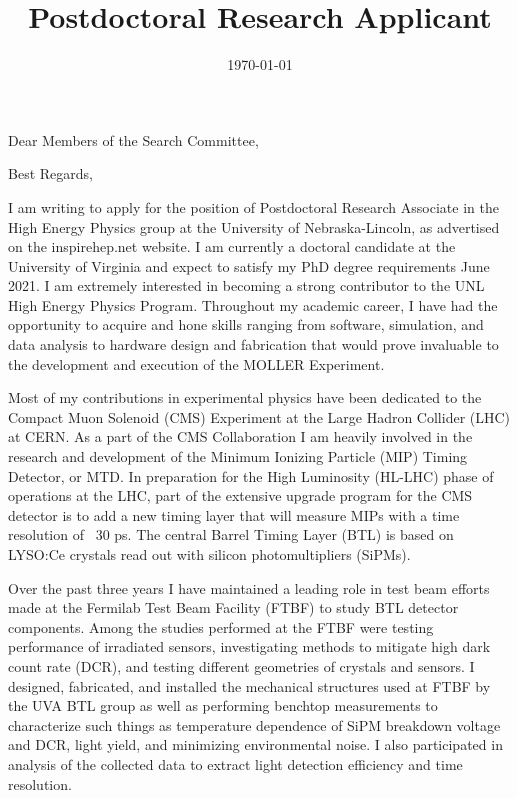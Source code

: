 \documentclass[10pt,a4paper,sans,english]{moderncv}        %
\title{Postdoctoral Research Applicant}                               %
\begin{document}
\date{\today}
\opening{Dear Members of the Search Committee,}
\closing{Best Regards,}
\makelettertitle

I am writing to apply for the position of Postdoctoral Research Associate in the High Energy Physics group at the University of Nebraska-Lincoln, as advertised on the inspirehep.net website.  I am currently a doctoral candidate at the University of Virginia and expect to satisfy my PhD degree requirements June 2021.  I am extremely interested in becoming a strong contributor to the UNL High Energy Physics Program.  Throughout my academic career, I have had the opportunity to acquire and hone skills ranging from software, simulation, and data analysis to hardware design and fabrication that would prove invaluable to the development and execution of the MOLLER Experiment.

Most of my contributions in experimental physics have been dedicated to the Compact Muon Solenoid (CMS) Experiment at the Large Hadron Collider (LHC) at CERN.  As a part of the CMS Collaboration I am heavily involved in the research and development of the Minimum Ionizing Particle (MIP) Timing Detector, or MTD.  In preparation for the High Luminosity (HL-LHC) phase of operations at the LHC, part of the extensive upgrade program for the CMS detector is to add a new timing layer that will measure MIPs with a time resolution of ~30 ps.  The central Barrel Timing Layer (BTL) is based on LYSO:Ce crystals read out with silicon photomultipliers (SiPMs).  

Over the past three years I have maintained a leading role in test beam efforts made at the Fermilab Test Beam Facility (FTBF) to study BTL detector components.  Among the studies performed at the FTBF were testing performance of irradiated sensors, investigating methods to mitigate high dark count rate (DCR), and testing different geometries of crystals and sensors.  I designed, fabricated, and installed the mechanical structures used at FTBF by the UVA BTL group as well as performing benchtop measurements to characterize such things as temperature dependence of SiPM breakdown voltage and DCR, light yield, and minimizing environmental noise.  I also participated in analysis of the collected data to extract light detection efficiency and time resolution.
\end{document}
